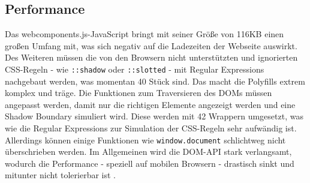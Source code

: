 \subsection{Performance}\label{performance}

Das webcomponents.js-JavaScript bringt mit seiner Größe von 116KB \cite{citeulike:13914238} einen großen Umfang mit, was sich negativ auf die Ladezeiten der Webseite auswirkt. Des Weiteren müssen die von den Browsern nicht unterstützten und ignorierten \ac{CSS}-Regeln - wie \texttt{::shadow} oder \texttt{::slotted} - mit Regular Expressions nachgebaut werden, was momentan 40 Stück sind. Das macht die Polyfills extrem komplex und träge. Die Funktionen zum Traversieren des \ac{DOM}s müssen angepasst werden, damit nur die richtigen Elemente angezeigt werden und eine Shadow Boundary simuliert wird. Diese werden mit 42 Wrappern umgesetzt, was wie die Regular Expressions zur Simulation der \ac{CSS}-Regeln sehr aufwändig ist. Allerdings können einige Funktionen wie \texttt{window.document} schlichtweg nicht überschrieben werden. Im Allgemeinen wird die \ac{DOM}-\ac{API} stark verlangsamt, wodurch die Performance - speziell auf mobilen Browsern - drastisch sinkt und mitunter nicht tolerierbar ist \cite{citeulike:13886251}.
